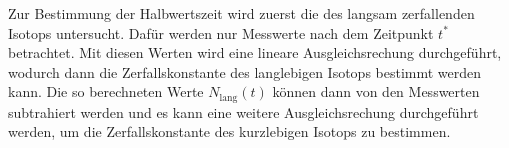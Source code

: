 Zur Bestimmung der Halbwertszeit wird zuerst die des langsam zerfallenden Isotops untersucht. Dafür werden nur Messwerte nach dem 
Zeitpunkt $t^{*}$ betrachtet. Mit diesen Werten wird eine lineare Ausgleichsrechung durchgeführt, wodurch dann die Zerfallskonstante
des langlebigen Isotops bestimmt werden kann. Die so berechneten Werte $N_\text{lang}(t)$ können dann von den Messwerten 
subtrahiert werden und es kann eine weitere Ausgleichsrechung durchgeführt werden, um die Zerfallskonstante des kurzlebigen
Isotops zu bestimmen. 
